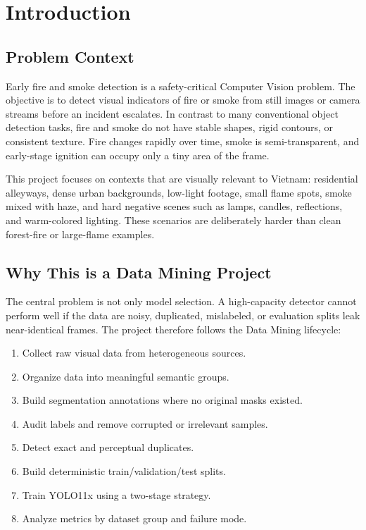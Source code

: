 \documentclass[12pt,a4paper]{report}
\begin{document}
\chapter{Introduction}
\section{Problem Context}
Early fire and smoke detection is a safety-critical Computer Vision problem. The objective is to detect visual indicators of fire or smoke from still images or camera streams before an incident escalates. In contrast to many conventional object detection tasks, fire and smoke do not have stable shapes, rigid contours, or consistent texture. Fire changes rapidly over time, smoke is semi-transparent, and early-stage ignition can occupy only a tiny area of the frame.

This project focuses on contexts that are visually relevant to Vietnam: residential alleyways, dense urban backgrounds, low-light footage, small flame spots, smoke mixed with haze, and hard negative scenes such as lamps, candles, reflections, and warm-colored lighting. These scenarios are deliberately harder than clean forest-fire or large-flame examples.

\section{Why This is a Data Mining Project}
The central problem is not only model selection. A high-capacity detector cannot perform well if the data are noisy, duplicated, mislabeled, or evaluation splits leak near-identical frames. The project therefore follows the Data Mining lifecycle:

\begin{enumerate}
    \item Collect raw visual data from heterogeneous sources.
    \item Organize data into meaningful semantic groups.
    \item Build segmentation annotations where no original masks existed.
    \item Audit labels and remove corrupted or irrelevant samples.
    \item Detect exact and perceptual duplicates.
    \item Build deterministic train/validation/test splits.
    \item Train YOLO11x using a two-stage strategy.
    \item Analyze metrics by dataset group and failure mode.
\end{enumerate}
\end{document}
